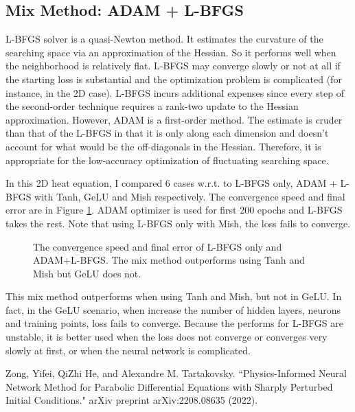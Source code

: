 \documentclass[11pt, a4paper]{article}
\begin{document}
    \subsection{Mix Method: ADAM + L-BFGS}

    L-BFGS solver is a quasi-Newton method. It estimates the curvature of the searching space via an approximation of the Hessian.
    So it performs well when the neighborhood is relatively flat. 
    L-BFGS may converge slowly or not at all if the starting loss is substantial and the optimization problem is complicated (for instance, in the 2D case).
    L-BFGS incurs additional expenses since every step of the second-order technique requires a rank-two update to the Hessian approximation.
    However, ADAM is a first-order method. The estimate is cruder than that of the L-BFGS in that it is only along each dimension and doesn't account for what would be the off-diagonals in the Hessian.
    Therefore, it is appropriate for the low-accuracy optimization of fluctuating searching space.

    In this 2D heat equation, I compared 6 cases w.r.t. to L-BFGS only, ADAM + L-BFGS with Tanh, GeLU and Mish respectively. The convergence speed and final error are in Figure \ref{fig:al}.
    ADAM optimizer is used for first 200 epochs and L-BFGS takes the rest. Note that using L-BFGS only with Mish, the loss fails to converge.

    \begin{figure}[htb]
        \caption{The convergence speed and final error of L-BFGS only and ADAM+L-BFGS. The mix method outperforms using Tanh and Mish but GeLU does not.}
        \label{fig:al}
    \end{figure}

    This mix method outperforms when using Tanh and Mish, but not in GeLU. 
    In fact, in the GeLU scenario, when increase the number of hidden layers, neurons and training points, loss fails to converge. 
    Because the performs for L-BFGS are unstable, it is better used when the loss does not converge or converges very slowly at first, or when the neural network is complicated. 
    \begin{thebibliography}{9}
           Zong, Yifei, QiZhi He, and Alexandre M. Tartakovsky. ``Physics-Informed Neural Network Method for Parabolic Differential Equations with Sharply Perturbed Initial Conditions." arXiv preprint arXiv:2208.08635 (2022).
    \end{thebibliography}
\end{document}
